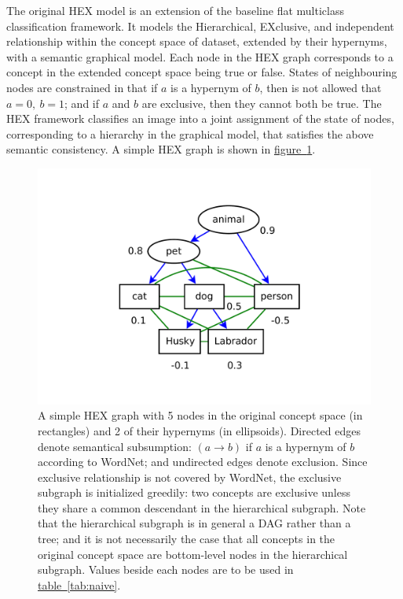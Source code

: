 \documentclass[11pt,a4paper]{book}
\begin{document}
The original HEX model \cite{deng2014large} is an extension of the baseline flat multiclass classification framework. It models the Hierarchical, EXclusive, and independent relationship within the concept space of dataset, extended by their hypernyms, with a semantic graphical model. Each node in the HEX graph corresponds to a concept in the extended concept space being true or false. States of neighbouring nodes are constrained in that if $a$ is a hypernym of $b$, then is not allowed that $a=0,\ b=1$; and if $a$ and $b$ are exclusive, then they cannot both be true. The HEX framework classifies an image into a joint assignment of the state of nodes, corresponding to a hierarchy in the graphical model, that satisfies the above semantic consistency. A simple HEX graph is shown in \hyperref[fig:naive]{figure~\ref{fig:naive}}.
\begin{figure}[htbp]
\centering
\includegraphics[scale=0.5]{naive.pdf}
\caption{A simple HEX graph with 5 nodes in the original concept space (in rectangles) and 2 of their hypernyms (in ellipsoids). Directed edges denote semantical subsumption: $(a\rightarrow b)$ if $a$ is a hypernym of $b$ according to WordNet; and undirected edges denote exclusion. Since exclusive relationship is not covered by WordNet, the exclusive subgraph is initialized greedily: two concepts are exclusive unless they share a common descendant in the hierarchical subgraph. Note that the hierarchical subgraph is in general a DAG rather than a tree; and it is not necessarily the case that all concepts in the original concept space are bottom-level nodes in the hierarchical subgraph. Values beside each nodes are to be used in \hyperref[tab:naive]{table~\ref{tab:naive}}.}
\label{fig:naive}
\end{figure}
\end{document}
